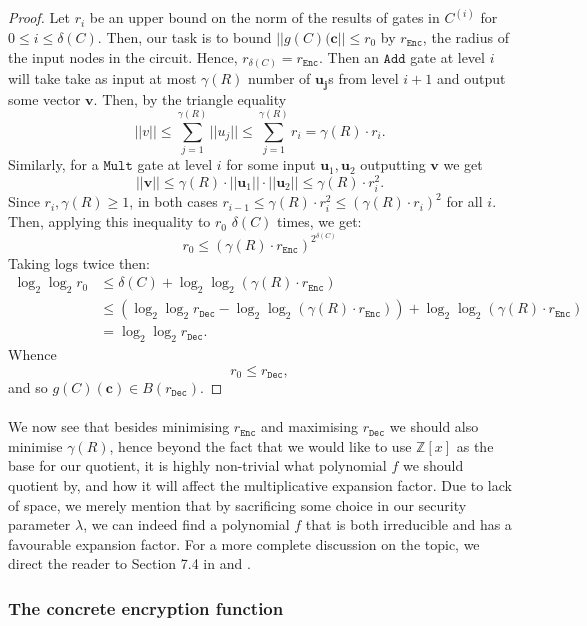\documentclass{article}
\theoremstyle{definition}
\theoremstyle{example}
\newcommand{\Enc}{\texttt{Enc}}
\newcommand{\Dec}{\texttt{Dec}}
\newcommand{\Int}{\mathbb{Z}}
\newcommand{\Add}{\texttt{Add}}
\newcommand{\Mult}{\texttt{Mult}}
\renewcommand{\vec}[1]{\mathbf{#1}}
\newcommand{\norm}[1]{||#1||}
\begin{document}
\begin{proof}
  Let $r_i$ be an upper bound on the norm of the results of gates in $C^{(i)}$
  for $0 \leq i \leq \delta(C)$. Then, our task is to bound $\norm{g(C)(\vec{c}}
  \leq r_0$ by $r_\Enc$, the radius of the input nodes in the circuit. Hence, $r_{\delta(C)} = r_\Enc$. Then
  an $\Add$ gate at level $i$ will take take as input at most $\gamma(R)$ number
  of $\vec{u_j}$s from level $i + 1$ and output some vector $\vec{v}$. Then, by
  the triangle equality
  \[
    \norm{v} \leq \sum_{j = 1}^{\gamma(R)}\norm{u_j} 
             \leq \sum_{j = 1}^{\gamma(R)} r_i
             = \gamma(R) \cdot r_i.
  \]
  Similarly, for a $\Mult$ gate at level $i$ for some input $\vec{u}_1,
  \vec{u}_2$ outputting $\vec{v}$ we get
  \[
    \norm{\vec{v}} \leq \gamma(R)\cdot\norm{\vec{u}_1}\cdot\norm{\vec{u}_2} \leq
    \gamma(R)\cdot r_i^2.
  \]
  Since $r_i, \gamma(R) \geq 1$, in both cases $r_{i-1} \leq \gamma(R)\cdot
  r_i^2 \leq (\gamma(R)\cdot r_i)^2$ for all $i$. Then, applying this inequality
  to $r_0$ $\delta(C)$ times, we get:
  \[
    r_0 \leq (\gamma(R)\cdot r_\Enc)^{2^{\delta(C)}}
  \]
  Taking logs twice then:
  \begin{align*}
    \log_2\log_2r_0 &\leq \delta(C) + \log_2\log_2(\gamma(R)\cdot r_\Enc)\\
                    &\leq (\log_2\log_2r_\Dec - \log_2\log_2(\gamma(R)\cdot r_\Enc)) + \log_2\log_2(\gamma(R)\cdot r_\Enc)\\
                    &= \log_2\log_2r_\Dec.
  \end{align*}
  Whence
  \[
    r_0 \leq r_\Dec,
  \]
  and so $g(C)(\vec{c}) \in B(r_\Dec)$.
\end{proof}
\paragraph{} We now see that besides minimising $r_\Enc$ and maximising $r_\Dec$
we should also minimise $\gamma(R)$, hence beyond the fact that we would like to
use $\Int[x]$ as the base for our quotient, it is highly non-trivial what
polynomial $f$ we should quotient by, and how it will affect the multiplicative
expansion factor. Due to lack of space, we merely mention that by sacrificing
some choice in our security parameter $\lambda$, we can indeed find a polynomial
$f$ that is both irreducible and has a favourable expansion factor. For a more complete
discussion on the topic, we direct the reader to Section 7.4 in
\cite{gentry2009fully} and \cite{lyubashevsky2006generalized}.
\subsubsection{The concrete encryption function}
\label{sec:enc_concretely}
\end{document}
